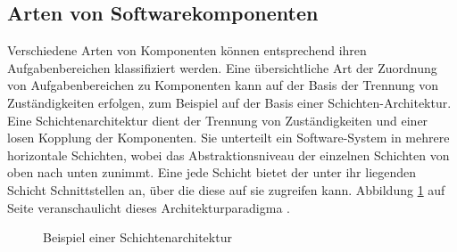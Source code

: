 \subsection{Arten von Softwarekomponenten}
\label{sec:2_Arten_Komponenten}

Verschiedene Arten von Komponenten können entsprechend ihren Aufgabenbereichen klassifiziert werden. Eine übersichtliche Art der Zuordnung von Aufgabenbereichen zu Komponenten kann auf der Basis der Trennung von Zuständigkeiten erfolgen, zum Beispiel auf der Basis einer Schichten-Architektur. Eine Schichtenarchitektur dient der Trennung von Zuständigkeiten und einer losen Kopplung der Komponenten. Sie unterteilt ein Software-System in mehrere horizontale Schichten, wobei das Abstraktionsniveau der einzelnen Schichten von oben nach unten zunimmt. Eine jede Schicht bietet der unter ihr liegenden Schicht Schnittstellen an, über die diese auf sie zugreifen kann. Abbildung \ref{fig:2_Schichtenarchitektur} auf Seite \pageref{fig:2_Schichtenarchitektur} veranschaulicht dieses Architekturparadigma \citereset \autocite{Andresen.2003}.

\begin{figure}[h]
  \centering
  \qquad
  \caption[
    Beispiel einer Schichtenarchitektur
  ]{
    Beispiel einer Schichtenarchitektur
  }
  \label{fig:2_Schichtenarchitektur}
\end{figure}

